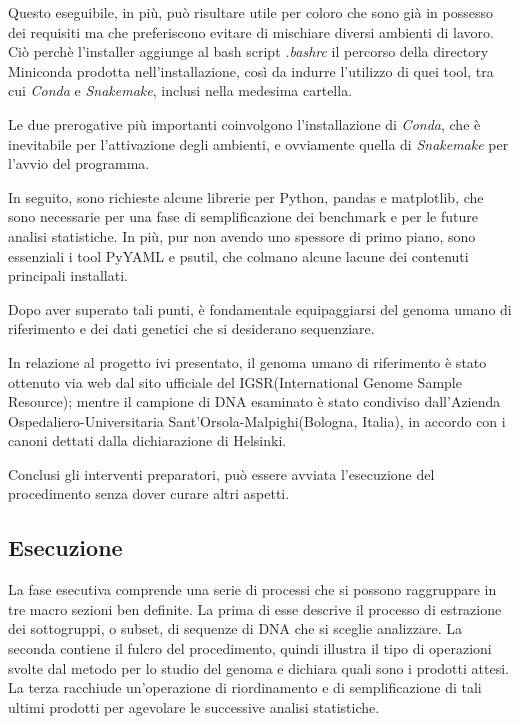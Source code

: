 Questo eseguibile, in più, può risultare utile per coloro che sono già in possesso dei requisiti ma che preferiscono evitare di mischiare diversi ambienti di lavoro.
Ciò perchè l'installer aggiunge al bash script \textit{.bashrc} il percorso della directory Miniconda prodotta nell'installazione, così da indurre l'utilizzo di quei tool, tra cui \textit{Conda} e \textit{Snakemake}, inclusi nella medesima cartella.


Le due prerogative più importanti coinvolgono l'installazione di \textit{Conda}, che è inevitabile per l'attivazione degli ambienti, e ovviamente quella di \textit{Snakemake} per l'avvio del programma.


In seguito, sono richieste alcune librerie per Python, pandas e matplotlib, che sono necessarie per una fase di semplificazione dei benchmark e per le future analisi statistiche.
In più, pur non avendo uno spessore di primo piano, sono essenziali i tool PyYAML e psutil, che colmano alcune lacune dei contenuti principali installati.


Dopo aver superato tali punti, è fondamentale equipaggiarsi del genoma umano di riferimento e dei dati genetici che si desiderano sequenziare.


In relazione al progetto ivi presentato, il genoma umano di riferimento è stato ottenuto via web dal sito ufficiale del IGSR(International Genome Sample Resource); mentre il campione di DNA esaminato è stato condiviso dall'Azienda Ospedaliero-Universitaria Sant'Orsola-Malpighi(Bologna, Italia), in accordo con i canoni dettati dalla dichiarazione di Helsinki.


Conclusi gli interventi preparatori, può essere avviata l'esecuzione del procedimento senza dover curare altri aspetti.


\subsection{Esecuzione}
La fase esecutiva comprende una serie di processi che si possono raggruppare in tre macro sezioni ben definite.
La prima di esse descrive il processo di estrazione dei sottogruppi, o subset, di sequenze di DNA che si sceglie analizzare.
La seconda contiene il fulcro del procedimento, quindi illustra il tipo di operazioni svolte dal metodo per lo studio del genoma e dichiara quali sono i prodotti attesi.
La terza racchiude un'operazione di riordinamento e di semplificazione di tali ultimi prodotti per agevolare le successive analisi statistiche.



